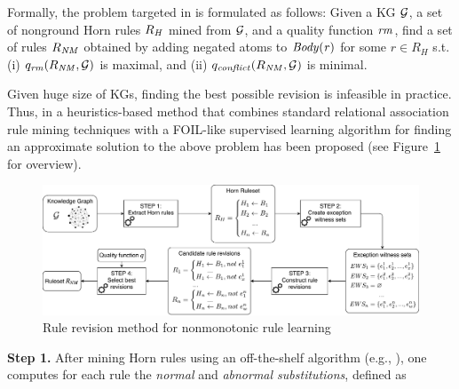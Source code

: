 Formally, the problem targeted in \cite{gad2016,rumis} is formulated as follows: Given a KG $\mathcal{G}$,
a set of nonground Horn rules $R_{\mathit{H}}$ mined from $\mathcal{G}$, and a quality
function $\mathit{rm}$, %
find a set of rules $R_{\mathit{NM}}$ obtained by
adding negated atoms to $\mathit{Body(r)}$ for some $r{\in} R_{H}$ s.t. (i)
${q_{\mathit{rm}}(R_{\mathit{NM}},\mathcal{G})}$ is maximal, and (ii)
${q_{\mathit{conflict}}(R_{\mathit{NM}},\mathcal{G})}$ is minimal.



Given huge size of KGs, finding the best possible revision is infeasible in practice. Thus, in \cite{gad2016,rumis} a heuristics-based method that combines standard relational association rule mining techniques with a FOIL-like supervised learning algorithm \cite{foil} for finding an approximate solution to the above problem has been proposed (see Figure~\ref{fig:iswc_process} for overview). 

\begin{figure}[t]
\centering
\includegraphics[width=1\textwidth]{figures/overview_new}
\caption{Rule revision method for nonmonotonic rule learning~\cite{gad2016,rumis}}
\label{fig:iswc_process}
\end{figure}
\noindent \textbf{Step 1.} After mining Horn rules using an off-the-shelf algorithm (e.g.,
 \cite{amie}), %
 one computes for each rule the \emph{normal} and
\emph{abnormal substitutions}, defined as

